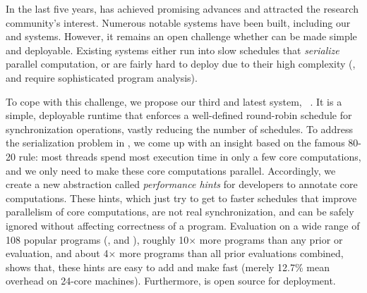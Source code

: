 In the last five years, \smt has achieved promising advances and attracted the research community's interest. Numerous notable \smt systems have been built, including our \tern and 
\peregrine systems. However, it remains an open challenge whether
\smt can be made simple and deployable. Existing \smt systems either run into slow schedules that
\emph{serialize} parallel computation, or are fairly hard to deploy
due to their high complexity (\eg, \tern and \peregrine require sophisticated program analysis).

To cope with this challenge, we propose our third and latest \smt system, 
\parrot~\cite{parrot}. It is a simple, deployable runtime that enforces a well-defined
round-robin schedule for synchronization operations, vastly reducing the number of
schedules. To address the serialization problem in \smt,
we come up with an insight based on the famous 80-20 rule: most threads spend most 
execution time in only a few core computations, and we only need to make 
these core computations parallel. Accordingly, we create a 
new abstraction called \emph{performance hints} for developers to 
annotate core computations. These hints, which just try to get to faster schedules that improve 
parallelism of core computations, are not real 
synchronization, and can be safely ignored without affecting correctness of a 
program. Evaluation on a wide range of 108 popular programs (\eg, \bdb and \mplayer),
roughly 10$\times$ more programs than any prior \smt or 
\dmt evaluation, and about 4$\times$ more programs than all prior evaluations combined, 
shows that, these hints are easy to add and make \parrot fast
(merely 12.7\% mean overhead on 24-core machines). Furthermore, \parrot is open source for deployment.




